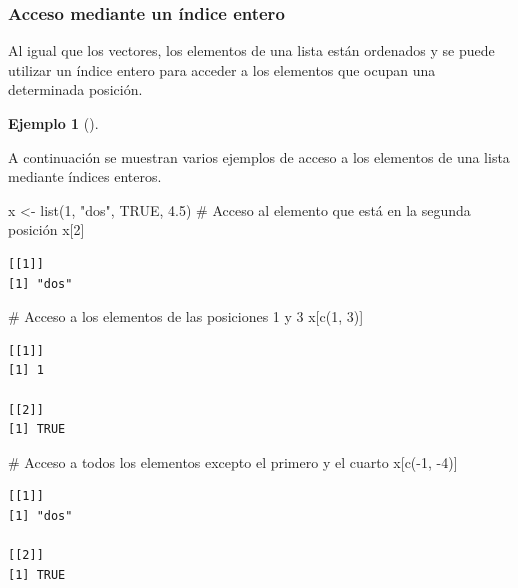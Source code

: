\documentclass[
  a4paper,
]{scrreport}
\newenvironment{Shaded}{\begin{snugshade}}{\end{snugshade}}
\newcommand{\CommentTok}[1]{\textcolor[rgb]{0.37,0.37,0.37}{#1}}
\newcommand{\ConstantTok}[1]{\textcolor[rgb]{0.56,0.35,0.01}{#1}}
\newcommand{\DecValTok}[1]{\textcolor[rgb]{0.68,0.00,0.00}{#1}}
\newcommand{\FloatTok}[1]{\textcolor[rgb]{0.68,0.00,0.00}{#1}}
\newcommand{\FunctionTok}[1]{\textcolor[rgb]{0.28,0.35,0.67}{#1}}
\newcommand{\NormalTok}[1]{\textcolor[rgb]{0.00,0.23,0.31}{#1}}
\newcommand{\OtherTok}[1]{\textcolor[rgb]{0.00,0.23,0.31}{#1}}
\newcommand{\SpecialCharTok}[1]{\textcolor[rgb]{0.37,0.37,0.37}{#1}}
\newcommand{\StringTok}[1]{\textcolor[rgb]{0.13,0.47,0.30}{#1}}
\theoremstyle{definition}
\newtheorem{example}{Ejemplo}[chapter]
\theoremstyle{definition}
\theoremstyle{remark}
\begin{document}
\hypertarget{acceso-mediante-un-uxedndice-entero-1}{%
\subsubsection{Acceso mediante un índice
entero}\label{acceso-mediante-un-uxedndice-entero-1}}

Al igual que los vectores, los elementos de una lista están ordenados y
se puede utilizar un índice entero para acceder a los elementos que
ocupan una determinada posición.

\leavevmode{}%
\begin{example}[]\label{exm-}

A continuación se muestran varios ejemplos de acceso a los elementos de
una lista mediante índices enteros.

\begin{Shaded}
\begin{Highlighting}[]
\NormalTok{x }\OtherTok{\textless{}{-}} \FunctionTok{list}\NormalTok{(}\DecValTok{1}\NormalTok{, }\StringTok{"dos"}\NormalTok{, }\ConstantTok{TRUE}\NormalTok{, }\FloatTok{4.5}\NormalTok{)}
\CommentTok{\# Acceso al elemento que está en la segunda posición}
\NormalTok{x[}\DecValTok{2}\NormalTok{]}
\end{Highlighting}
\end{Shaded}

\begin{verbatim}
[[1]]
[1] "dos"
\end{verbatim}

\begin{Shaded}
\begin{Highlighting}[]
\CommentTok{\# Acceso a los elementos de las posiciones 1 y 3}
\NormalTok{x[}\FunctionTok{c}\NormalTok{(}\DecValTok{1}\NormalTok{, }\DecValTok{3}\NormalTok{)]}
\end{Highlighting}
\end{Shaded}

\begin{verbatim}
[[1]]
[1] 1

[[2]]
[1] TRUE
\end{verbatim}

\begin{Shaded}
\begin{Highlighting}[]
\CommentTok{\# Acceso a todos los elementos excepto el primero y el cuarto}
\NormalTok{x[}\FunctionTok{c}\NormalTok{(}\SpecialCharTok{{-}}\DecValTok{1}\NormalTok{, }\SpecialCharTok{{-}}\DecValTok{4}\NormalTok{)]}
\end{Highlighting}
\end{Shaded}

\begin{verbatim}
[[1]]
[1] "dos"

[[2]]
[1] TRUE
\end{verbatim}

\end{example}
\end{document}
